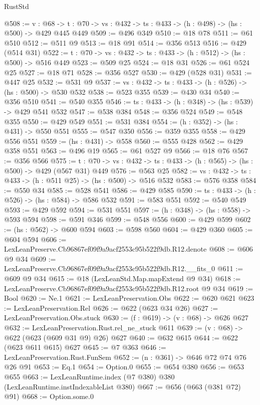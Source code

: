 \begin{lexlean}{RustStd}
\begin{coremodule}
@508 := {v : @68} ->
  {t : @70} -> {vs : @432} -> {ts : @433} -> (h : @498) -> (hs : @500) -> @429 @445 @449
@509 := @496 @349
@510 := @18 @78
@511 := @61 @510
@512 := @511 @9
@513 := @18 @91
@514 := @356 @513
@516 := @429 (@514 @31)
@522 := {t : @70} -> {vs : @432} -> {ts : @433} -> (h : @512) -> (hs : @500) -> @516 @449
@523 := @509 @25
@524 := @18 @31
@526 := @61 @524 @25
@527 := @18 @71
@528 := @356 @527
@530 := @429 (@528 @31)
@531 := @447 @25
@532 := @531 @9
@537 := {vs : @432} -> {ts : @433} -> (h : @526) -> (hs : @500) -> @530 @532
@538 := @523 @355
@539 := @430 @34
@540 := @356 @510
@541 := @540 @355
@546 := {ts : @433} -> (h : @348) -> (hs : @539) -> @429 @541 @532
@547 := @538 @384
@548 := @356 @524
@549 := @548 @355
@550 := @429 @549
@551 := @531 @384
@554 := (h : @352) -> (hs : @431) -> @550 @551
@555 := @547 @350
@556 := @359 @355
@558 := @429 @556 @551
@559 := (hs : @431) -> @558
@560 := @555 @428
@562 := @429 @358 @551
@563 := @496 @19
@565 := @61 @527 @9
@566 := @18 @76
@567 := @356 @566
@575 := {t : @70} -> {vs : @432} -> {ts : @433} -> (h : @565) -> (hs : @500) -> @429 (@567 @31) @449
@576 := @563 @25
@582 := {vs : @432} -> {ts : @433} -> (h : @511 @25) -> (hs : @500) -> @516 @532
@583 := @576 @358
@584 := @550 @34
@585 := @528 @541
@586 := @429 @585
@590 := {ts : @433} -> (h : @526) -> (hs : @584) -> @586 @532
@591 := @583 @551
@592 := @540 @549
@593 := @429 @592
@594 := @531 @551
@597 := (h : @348) -> (hs : @558) -> @593 @594
@598 := @591 @346
@599 := @548 @556
@600 := @429 @599
@602 := (hs : @562) -> @600 @594
@603 := @598 @560
@604 := @429 @360
@605 := @604 @594
@606 := LexLeanPreserve.Cb96867ef09f9a9acf2553c95b522f9db.R12.denote
@608 := @606 @9 @34
@609 := LexLeanPreserve.Cb96867ef09f9a9acf2553c95b522f9db.R12.__fits_0
@611 := @609 @9 @34
@615 := @18 (LexLeanStd.Map.mapExtend @9 @34)
@618 := LexLeanPreserve.Cb96867ef09f9a9acf2553c95b522f9db.R12.root @9 @34
@619 := Bool
@620 := Ne.{1}
@621 := LexLeanPreservation.Obs
@622 := @620 @621
@623 := LexLeanPreservation.Rel
@626 := @622 (@623 @34 @26)
@627 := LexLeanPreservation.Obs.stuck
@630 := (f : @619) -> (v : @68) -> @626 @627
@632 := LexLeanPreservation.Rust.rel_ne_stuck @611
@639 := (v : @68) -> @622 (@623 (@609 @31 @9) @26) @627
@640 := @632 @615
@644 := @622 (@623 @611 @615) @627
@645 := @7 @363
@646 := LexLeanPreservation.Rust.FunSem
@652 := (n : @361) -> @646 @72 @74 @76 @26 @91
@653 := Eq.{1}
@654 := Option.{0}
@655 := @654 @380
@656 := @653 @655
@663 := LexLeanRuntime.index (@7 @380) @380 (LexLeanRuntime.instIndexableList @380)
@667 := @656 (@663 (@381 @72) @91)
@668 := Option.some.{0}

\end{coremodule}
\end{lexlean}
